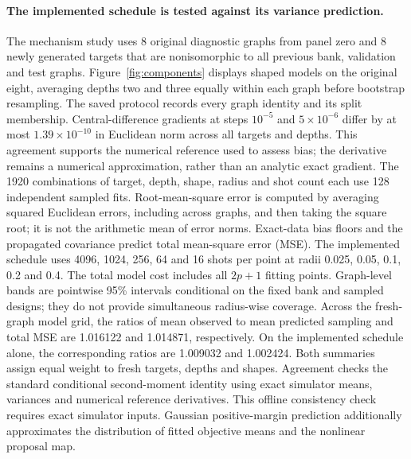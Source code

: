 {\paragraph{The implemented schedule is tested against its variance prediction.}
The mechanism study uses 8 original diagnostic graphs from panel zero and 8 newly generated targets that are nonisomorphic to all previous bank, validation and test graphs. Figure~\ref{fig:components} displays shaped models on the original eight, averaging depths two and three equally within each graph before bootstrap resampling. The saved protocol records every graph identity and its split membership.
Central-difference gradients at steps $10^{-5}$ and $5\times10^{-6}$ differ by at most $1.39\times10^{-10}$ in Euclidean norm across all targets and depths. This agreement supports the numerical reference used to assess bias; the derivative remains a numerical approximation, rather than an analytic exact gradient.
The 1920 combinations of target, depth, shape, radius and shot count each use 128 independent sampled fits. Root-mean-square error is computed by averaging squared Euclidean errors, including across graphs, and then taking the square root; it is not the arithmetic mean of error norms. Exact-data bias floors and the propagated covariance predict total mean-square error (MSE). The implemented schedule uses 4096, 1024, 256, 64 and 16 shots per point at radii 0.025, 0.05, 0.1, 0.2 and 0.4. The total model cost includes all $2p+1$ fitting points. Graph-level bands are pointwise 95\% intervals conditional on the fixed bank and sampled designs; they do not provide simultaneous radius-wise coverage.
Across the fresh-graph model grid, the ratios of mean observed to mean predicted sampling and total MSE are 1.016122 and 1.014871, respectively. On the implemented schedule alone, the corresponding ratios are 1.009032 and 1.002424. Both summaries assign equal weight to fresh targets, depths and shapes. Agreement checks the standard conditional second-moment identity using exact simulator means, variances and numerical reference derivatives. This offline consistency check requires exact simulator inputs. Gaussian positive-margin prediction additionally approximates the distribution of fitted objective means and the nonlinear proposal map.
}
